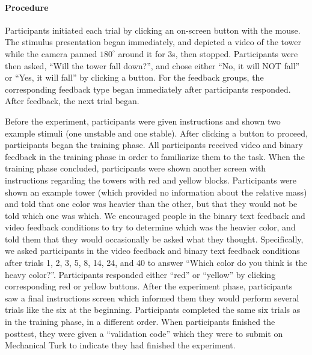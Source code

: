 \documentclass[10pt,letterpaper]{article}
\newcommand{\rlow}[0]{$r_0=0.1$}
\newcommand{\rhigh}[0]{$r_0=10$}
\newcommand{\vfblow}[0]{V(0.1)}
\newcommand{\vfbhigh}[0]{V(10)}
\newcommand{\vfb}[0]{video feedback}
\newcommand{\fblow}[0]{B(0.1)}
\newcommand{\fbhigh}[0]{B(10)}
\newcommand{\fb}[0]{binary text feedback}
\newcommand{\nfb}[0]{NFB}
\newenvironment{pitemize}{
\begin{itemize}
  \setlength{\itemsep}{1pt}
  \setlength{\parskip}{0pt}
  \setlength{\parsep}{0pt}
}{\end{itemize}}
\begin{document}

\paragraph{Procedure}

Participants initiated each trial by clicking an on-screen button with
the mouse. The stimulus presentation began immediately, and depicted a
video of the tower while the camera panned $180^\circ$ around it for
3s, then stopped. Participants were then asked, ``Will the tower fall
down?'', and chose either ``No, it will NOT fall'' or ``Yes, it will
fall'' by clicking a button. For the feedback groups, the
corresponding feedback type began immediately after participants
responded. After feedback, the next trial began.

Before the experiment, participants were given instructions and shown
two example stimuli (one unstable and one stable). After clicking a
button to proceed, participants began the training phase. All
participants received video and binary feedback in the training phase
in order to familiarize them to the task.  When the training phase
concluded, participants were shown another screen with instructions
regarding the towers with red and yellow blocks. Participants were
shown an example tower (which provided no information about the
relative mass) and told that one color was heavier than the other, but
that they would not be told which one was which. We encouraged people
in the \fb{} and \vfb{} conditions to try to determine which was the
heavier color, and told them that they would occasionally be asked
what they thought. Specifically, we asked participants in the \vfb{}
and \fb{} conditions after trials 1, 2, 3, 5, 8, 14, 24, and 40 to
answer ``Which color do you think is the heavy color?''. Participants
responded either ``red'' or ``yellow'' by clicking corresponding red
or yellow buttons. After the experiment phase, participants saw a
final instructions screen which informed them they would perform
several trials like the six at the beginning. Participants completed
the same six trials as in the training phase, in a different
order. When participants finished the posttest, they were given a
``validation code'' which they were to submit on Mechanical Turk to
indicate they had finished the experiment.
\end{document}
